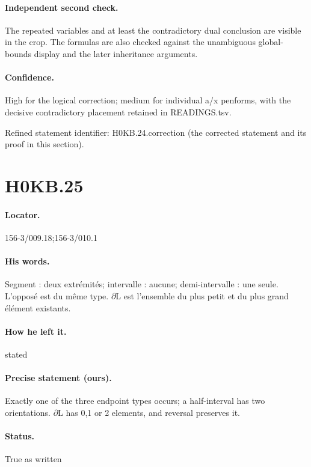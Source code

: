 \paragraph{Independent second check.} The repeated variables and at least the contradictory dual conclusion are visible in the crop. The formulas are also checked against the unambiguous global-bounds display and the later inheritance arguments.

\paragraph{Confidence.} High for the logical correction; medium for individual a/x penforms, with the decisive contradictory placement retained in READINGS.tsv.

\noindent Refined statement identifier: H0KB.24.correction (the corrected statement and its proof in this section).

\section*{H0KB.25}\label{statement:H0KB.25}
\paragraph{Locator.} 156-3/009.18;156-3/010.1

\paragraph{His words.} Segment : deux extrémités; intervalle : aucune; demi-intervalle : une seule. L’opposé est du même type. \ensuremath{\partial}L est l’ensemble du plus petit et du plus grand élément existants.

\paragraph{How he left it.} stated

\paragraph{Precise statement (ours).} Exactly one of the three endpoint types occurs; a half-interval has two orientations. \ensuremath{\partial}L has 0,1 or 2 elements, and reversal preserves it.

\paragraph{Status.} True as written

